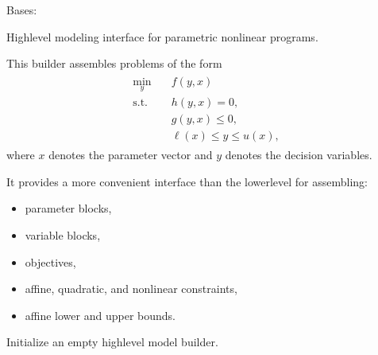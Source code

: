 \documentclass[letterpaper,10pt,english,openany,oneside]{sphinxmanual}
\begin{document}
\begin{fulllineitems}

\pysigstartsignatures
{}
\pysigstopsignatures
\sphinxAtStartPar
Bases: 

\sphinxAtStartPar
High\sphinxhyphen{}level modeling interface for parametric nonlinear programs.

\sphinxAtStartPar
This builder assembles problems of the form
\begin{equation*}
\begin{split}\begin{aligned}
    \min_y \quad & f(y, x) \\
    \text{s.t.}\quad & h(y, x) = 0, \\
    & g(y, x) \le 0, \\
    & \ell(x) \le y \le u(x),
\end{aligned}\end{split}
\end{equation*}
\sphinxAtStartPar
where \(x\) denotes the parameter vector and \(y\) denotes the
decision variables.

\sphinxAtStartPar
It provides a more convenient interface than the lower\sphinxhyphen{}level
{\hyperref[\detokenize{api/core/jaxmodel/builder:jaxmodel.builder.NLPBuilder}]{}} for assembling:
\begin{itemize}
\item {} 
\sphinxAtStartPar
parameter blocks,

\item {} 
\sphinxAtStartPar
variable blocks,

\item {} 
\sphinxAtStartPar
objectives,

\item {} 
\sphinxAtStartPar
affine, quadratic, and nonlinear constraints,

\item {} 
\sphinxAtStartPar
affine lower and upper bounds.

\end{itemize}

\sphinxAtStartPar
Initialize an empty high\sphinxhyphen{}level model builder.



\end{fulllineitems}
\end{document}
